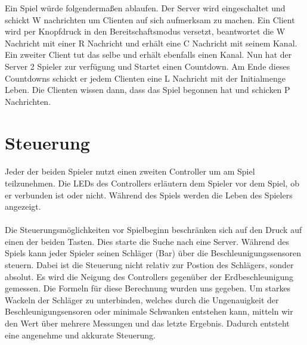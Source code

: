 Ein Spiel würde folgendermaßen ablaufen. Der Server wird eingeschaltet und schickt W nachrichten um Clienten auf sich aufmerksam zu machen. Ein Client wird per Knopfdruck in den Bereitschaftsmodus versetzt, beantwortet die W Nachricht mit einer R Nachricht und erhält eine C Nachricht mit seinem Kanal. Ein zweiter Client tut das selbe und erhält ebenfalls einen Kanal. Nun hat der Server 2 Spieler zur verfügung und Startet einen Countdown. Am Ende dieses Countdowns schickt er jedem Clienten eine L Nachricht mit der Initialmenge Leben. Die Clienten wissen dann, dass das Spiel begonnen hat und schicken P Nachrichten.

\section*{Steuerung}

\paragraph*{}
Jeder der beiden Spieler nutzt einen zweiten Controller um am Spiel teilzunehmen. Die LEDs des Controllers erläutern dem Spieler vor dem Spiel, ob er verbunden ist oder nicht. Während des Spiels werden die Leben des Spielers angezeigt. 

\paragraph*{}
Die Steuerungsmöglichkeiten vor Spielbeginn beschränken sich auf den Druck auf einen der beiden Tasten. Dies starte die Suche nach eine Server. Während des Spiels kann jeder Spieler seinen Schläger (Bar) über die Beschleunigungssensoren steuern. Dabei ist die Steuerung nicht relativ zur Postion des Schlägers, sonder absolut. Es wird die Neigung des Controllers gegenüber der Erdbeschleunigung gemessen. Die Formeln für diese Berechnung wurden uns gegeben. Um starkes Wackeln der Schläger zu unterbinden, welches durch die Ungenauigkeit der Beschleunigungsensoren oder minimale Schwanken entstehen kann, mitteln wir den Wert über mehrere Messungen und das letzte Ergebnis. Dadurch entsteht eine angenehme und akkurate Steuerung.

